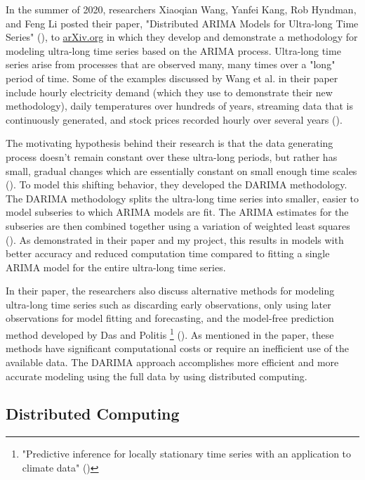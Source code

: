 \documentclass[
]{article}
\begin{document}
In the summer of 2020, researchers Xiaoqian Wang, Yanfei Kang, Rob Hyndman, and Feng Li posted their paper, "Distributed ARIMA Models for Ultra-long Time Series" (\cite*{wang_distributed_2020}), to \href{https://arxiv.org/abs/2007.09577}{arXiv.org} in which they develop and demonstrate a methodology for modeling ultra-long time series based on the ARIMA process. Ultra-long time series arise from processes that are observed many, many times over a "long" period of time. Some of the examples discussed by Wang et al. in their paper include hourly electricity demand (which they use to demonstrate their new methodology), daily temperatures over hundreds of years, streaming data that is continuously generated, and stock prices recorded hourly over several years (\cite*[p.~2]{wang_distributed_2020}). 

The motivating hypothesis behind their research is that the data generating process doesn't remain constant over these ultra-long periods, but rather has small, gradual changes which are essentially constant on small enough time scales (\cite*[p.~2]{wang_distributed_2020}). To model this shifting behavior, they developed the DARIMA methodology. The DARIMA methodology splits the ultra-long time series into smaller, easier to model subseries to which ARIMA models are fit. The ARIMA estimates for the subseries are then combined together using a variation of weighted least squares (\cite{zhu_dlsa_2019}). As demonstrated in their paper and my project, this results in models with better accuracy and reduced computation time compared to fitting a single ARIMA model for the entire ultra-long time series.

In their paper, the researchers also discuss alternative methods for modeling ultra-long time series such as discarding early observations, only using later observations for model fitting and forecasting, and the model-free prediction method developed by Das and Politis \footnote{"Predictive inference for locally stationary time series with an application to climate data" (\cite*{das_predictive_2020})} (\cite[p.~2]{wang_distributed_2020}). As mentioned in the paper, these methods have significant computational costs or require an inefficient use of the available data. The DARIMA approach accomplishes more efficient and more accurate modeling using the full data by using distributed computing.

\subsection*{Distributed Computing}
\end{document}
